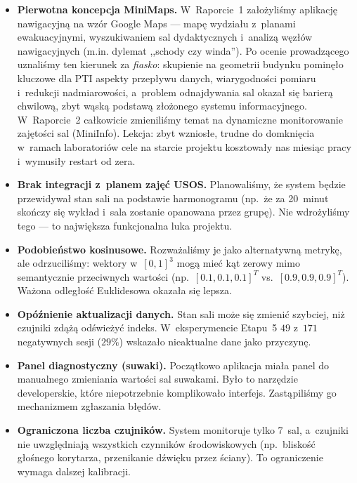 \documentclass[14pt,a4paper]{extarticle}
\begin{document}
\begin{itemize}
    \item \textbf{Pierwotna koncepcja MiniMaps.} W~Raporcie~1 założyliśmy aplikację nawigacyjną na wzór Google Maps --- mapę wydziału z~planami ewakuacyjnymi, wyszukiwaniem sal dydaktycznych i~analizą węzłów nawigacyjnych (m.in. dylemat ,,schody czy winda''). Po ocenie prowadzącego uznaliśmy ten kierunek za \emph{fiasko}: skupienie na geometrii budynku pominęło kluczowe dla PTI aspekty przepływu danych, wiarygodności pomiaru i~redukcji nadmiarowości, a~problem odnajdywania sal okazał się barierą chwilową, zbyt wąską podstawą złożonego systemu informacyjnego. W~Raporcie~2 całkowicie zmieniliśmy temat na dynamiczne monitorowanie zajętości sal (MiniInfo). Lekcja: zbyt wzniosłe, trudne do domknięcia w~ramach laboratoriów cele na starcie projektu kosztowały nas miesiąc pracy i~wymusiły restart od zera.
    \item \textbf{Brak integracji z~planem zajęć USOS.} Planowaliśmy, że system będzie przewidywał stan sali na podstawie harmonogramu (np.~że za 20~minut skończy się wykład i~sala zostanie opanowana przez grupę). Nie wdrożyliśmy tego --- to największa funkcjonalna luka projektu.

    \item \textbf{Podobieństwo kosinusowe.} Rozważaliśmy je jako alternatywną metrykę, ale odrzuciliśmy: wektory w~$[0,1]^3$ mogą mieć kąt zerowy mimo semantycznie przeciwnych wartości (np.~$[0.1,0.1,0.1]^T$ vs.~$[0.9,0.9,0.9]^T$). Ważona odległość Euklidesowa okazała się lepsza.

    \item \textbf{Opóźnienie aktualizacji danych.} Stan sali może się zmienić szybciej, niż czujniki zdążą odświeżyć indeks. W~eksperymencie Etapu~5 $49$ z~$171$ negatywnych sesji ($29\%$) wskazało nieaktualne dane jako przyczynę.

    \item \textbf{Panel diagnostyczny (suwaki).} Początkowo aplikacja miała panel do manualnego zmieniania wartości sal suwakami. Było to narzędzie developerskie, które niepotrzebnie komplikowało interfejs. Zastąpiliśmy go mechanizmem zgłaszania błędów.

    \item \textbf{Ograniczona liczba czujników.} System monitoruje tylko 7~sal, a~czujniki nie uwzględniają wszystkich czynników środowiskowych (np.~bliskość głośnego korytarza, przenikanie dźwięku przez ściany). To ograniczenie wymaga dalszej kalibracji.
\end{itemize}
\end{document}
